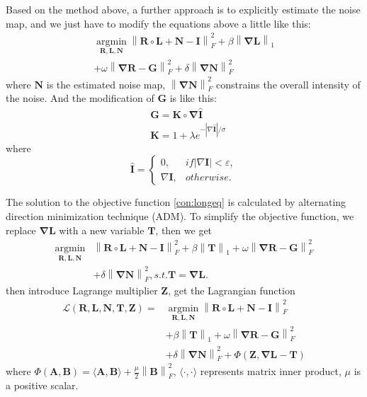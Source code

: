 \documentclass[10pt,twocolumn,letterpaper]{article}
\begin{document}
Based on the method above, a further approach is to explicitly estimate the noise map, and we just have to modify the equations above a little like this:
\begin{equation}
\begin{split}
    \mathop{\arg\min}\limits_{\mathbf{R,L,N}}\mathbf{ \left\|R \circ L + N - I \right\|}_F^2+\beta \mathbf{ \left\| \nabla L\right\|}_1 \\
    + \omega \mathbf{\left\| \nabla R - G \right\|}_F^2 + \delta \mathbf{ \left\| \nabla N\right\|}_F^2 \label{con:longeq}
\end{split}
\end{equation}
where $\mathbf{N}$ is the estimated noise map, $ \mathbf{ \left\| \nabla N\right\|}_F^2$ constrains the overall intensity of the noise. And the modification of $\mathbf{G}$ is like this:
\begin{align}
    &\mathbf{G = K \circ \nabla \hat{I}} \\
    &\mathbf{K} = 1 + \lambda e^{-|\nabla \mathbf{\hat{I}}|/\sigma}
\end{align}
where
\begin{equation}
    \mathbf{\hat{I}} = \begin{cases}
    0 , &if |\nabla \mathbf{I}|< \varepsilon, \\
    \nabla \mathbf{I} , &otherwise.
    \end{cases}
\end{equation}

The solution to the objective function \ref{con:longeq} is calculated by  alternating direction minimization technique (ADM). To simplify the objective function, we replace $\mathbf{\nabla L}$ with a new variable $\mathbf{T}$, then we get
\begin{equation}
\begin{split}
    \mathop{\arg\min}\limits_{\mathbf{R,L,N}}&\mathbf{ \left\|R \circ L + N - I \right\|}_F^2+\beta \mathbf{ \left\|T\right\|}_1 + \omega \mathbf{\left\| \nabla R - G \right\|}_F^2 \\
    &+ \delta \mathbf{ \left\| \nabla N\right\|}_F^2,  s.t. \mathbf{ T = \nabla{L}}. \label{con:fin_arg}
\end{split}
\end{equation}    
then introduce Lagrange multiplier $\mathbf{Z}$, get the Lagrangian function
\begin{equation}
\begin{split}
    \mathcal{L}(\mathbf{R,L,N,T,Z}) = &\mathop{\arg\min}\limits_{\mathbf{R,L,N}}\mathbf{ \left\|R \circ L + N - I \right\|}_F^2 \\
    &+\beta \mathbf{ \left\|T\right\|}_1 + \omega \mathbf{\left\| \nabla R - G \right\|}_F^2 \\
    &+ \delta \mathbf{ \left\| \nabla N\right\|}_F^2 + \Phi(\mathbf{Z, \nabla L - T}) \label{con:fin}
\end{split}
\end{equation}    
where $\Phi(\mathbf{A,B}) = \langle \mathbf{A, B} \rangle + \frac{\mu}{2}\mathbf{ \left\|B\right\|}_F^2$, $\langle \cdot,\cdot \rangle$ represents matrix inner product, $\mu$ is a positive scalar.
\end{document}
